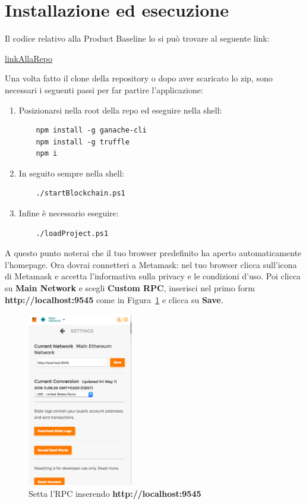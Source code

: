 \section{Installazione ed esecuzione}
Il codice relativo alla Product Baseline lo si può trovare al seguente link:
\begin{center}
	\url{linkAllaRepo}
\end{center}
Una volta fatto il clone della repository o dopo aver scaricato lo zip, sono necessari i seguenti passi per far partire l'applicazione:
\begin{enumerate}
	\item Posizionarsi nella root della repo ed eseguire nella shell:
		\begin{lstlisting}
	npm install -g ganache-cli
	npm install -g truffle
	npm i
		\end{lstlisting}
	\item In seguito sempre nella shell:
		\begin{lstlisting}
	./startBlockchain.ps1
		\end{lstlisting}
	\item Infine è necessario eseguire:
		\begin{lstlisting}
	./loadProject.ps1
		\end{lstlisting}
\end{enumerate}

A questo punto noterai che il tuo browser predefinito ha aperto automaticamente l'homepage.
Ora dovrai connetteri a Metamask: nel tuo browser clicca sull'icona di Metamask e accetta l'informativa sulla privacy e le condizioni d'uso. Poi clicca su \textbf{Main Network} e scegli \textbf{Custom RPC}, inserisci nel primo form \textbf{http://localhost:9545} come in Figura~\ref{fig:metamask1} e clicca su  \textbf{Save}.

\begin{figure}[h]
\centering
\includegraphics[height=3in]{./img/settings.png}
\caption{Setta l'RPC inserendo \textbf{http://localhost:9545}}
\label{fig:metamask1}
\end{figure}

